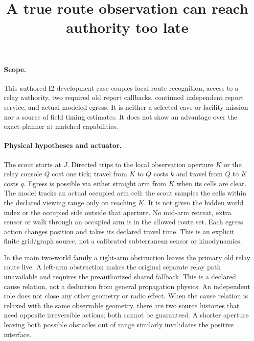 \documentclass[11pt]{article}
\title{A true route observation can reach authority too late}
\date{}
\begin{document}
\maketitle

\paragraph{Scope.}
This authored I2 development case couples local route recognition,
access to a relay authority, two required old report callbacks,
continued independent report service, and actual modeled egress.
It is neither a selected cave or facility mission nor a source of
field timing estimates. It does not show an advantage over the
exact planner at matched capabilities.

\paragraph{Physical hypotheses and actuator.}
The scout starts at $J$. Directed trips to the local observation
aperture $K$ or the relay console $Q$ cost one tick; travel from
$K$ to $Q$ costs $k$ and travel from $Q$ to $K$ costs $q$.
Egress is possible via either straight arm from $K$ when its
cells are clear. The model tracks an actual occupied arm cell:
the scout samples the cells within the declared viewing range
only on reaching $K$. It is not given the hidden world index
or the occupied side outside that aperture. No mid-arm retreat,
extra sensor or walk through an occupied arm is in the allowed
route set. Each egress action changes position and takes its
declared travel time. This is an explicit finite grid/graph
source, not a calibrated subterranean sensor or kinodynamics.

In the main two-world family a right-arm obstruction leaves
the primary old relay route live. A left-arm obstruction
makes the original separate relay path unavailable and requires
the preauthorized shared fallback. This is a declared cause
relation, not a deduction from general propagation physics.
An independent role does not close any other geometry or
radio effect. When the cause relation is relaxed with the
same observable geometry, there are two source histories that
need opposite irreversible actions; both cannot be guaranteed.
A shorter aperture leaving both possible obstacles out of
range similarly invalidates the positive interface.
\end{document}
